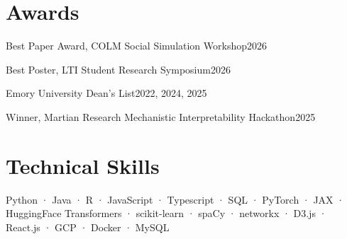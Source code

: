 \documentclass[10pt,letterpaper]{article}
\begin{document}
\section*{Awards}
Best Paper Award, COLM Social Simulation Workshop\hfill 2026\par
Best Poster, LTI Student Research Symposium\hfill 2026\par
Emory University Dean's List\hfill 2022, 2024, 2025\par
Winner, Martian Research Mechanistic Interpretability Hackathon\hfill 2025\par
\section*{Technical Skills}
Python · Java · R · JavaScript · Typescript · SQL · PyTorch · JAX · HuggingFace Transformers · scikit-learn · spaCy · networkx · D3.js · React.js · GCP · Docker · MySQL
\end{document}
